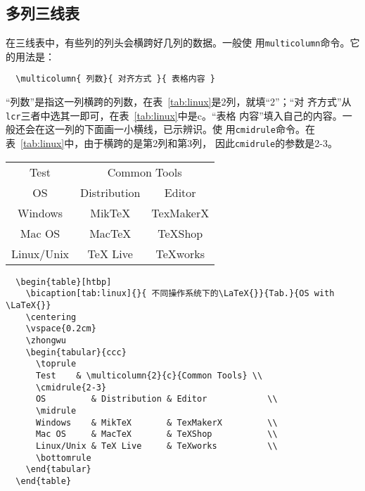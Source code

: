 \subsection{多列三线表}

在三线表中，有些列的列头会横跨好几列的数据。一般使
用\texttt{multicolumn}命令。它的用法是：
\begin{lstlisting}
  \multicolumn{ 列数}{ 对齐方式 }{ 表格内容 }
\end{lstlisting}

“列数”是指这一列横跨的列数，在表~\ref{tab:linux}是2列，就填“2”；“对
齐方式”从\texttt{lcr}三者中选其一即可，在表~\ref{tab:linux}中是c。“表格
内容”填入自己的内容。一般还会在这一列的下面画一小横线，已示辨识。使
用\texttt{cmidrule}命令。在表~\ref{tab:linux}中，由于横跨的是第2列和第3列，
因此\texttt{cmidrule}的参数是2-3。

\begin{table}[htbp]
  \centering
  \vspace{0.2cm}
  \zhongwu
  \begin{tabular}{ccc}
    \toprule
    Test    & \multicolumn{2}{c}{Common Tools} \\
    \cmidrule{2-3}
    OS         & Distribution & Editor            \\
    \midrule
    Windows    & MikTeX       & TexMakerX         \\
    Mac OS     & MacTeX       & TeXShop           \\
    Linux/Unix & TeX Live     & TeXworks          \\
    \bottomrule
  \end{tabular}
\end{table}


\begin{lstlisting}
  \begin{table}[htbp]
    \bicaption[tab:linux]{}{ 不同操作系统下的\LaTeX{}}{Tab.}{OS with \LaTeX{}}
    \centering
    \vspace{0.2cm}
    \zhongwu
    \begin{tabular}{ccc}
      \toprule
      Test    & \multicolumn{2}{c}{Common Tools} \\
      \cmidrule{2-3}
      OS         & Distribution & Editor            \\
      \midrule
      Windows    & MikTeX       & TexMakerX         \\
      Mac OS     & MacTeX       & TeXShop           \\
      Linux/Unix & TeX Live     & TeXworks          \\
      \bottomrule
    \end{tabular}
  \end{table}
\end{lstlisting}

